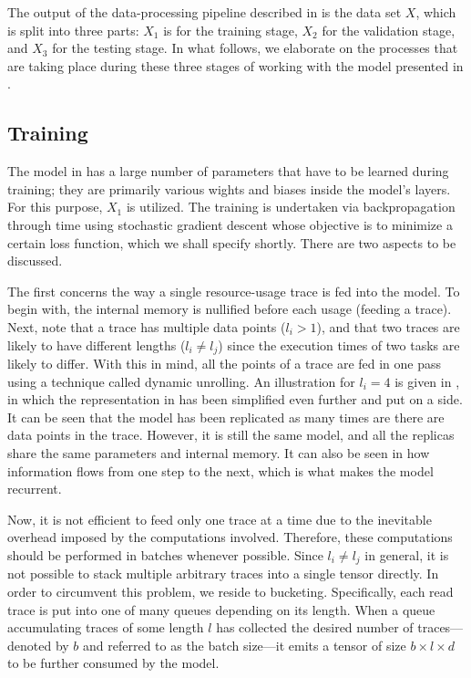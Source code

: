 The output of the data-processing pipeline described in  is the data
set $X$, which is split into three parts: $X_1$ is for the training stage, $X_2$
for the validation stage, and $X_3$ for the testing stage. In what follows, we
elaborate on the processes that are taking place during these three stages of
working with the model presented in .

\subsection{Training} 
The model in  has a large number of parameters that have to be
learned during training; they are primarily various wights and biases inside the
model's layers. For this purpose, $X_1$ is utilized. The training is undertaken
via backpropagation through time using stochastic gradient descent
\cite{goodfellow2016} whose objective is to minimize a certain loss function,
which we shall specify shortly. There are two aspects to be discussed.


The first concerns the way a single resource-usage trace is fed into the model.
To begin with, the internal memory is nullified before each usage (feeding a
trace). Next, note that a trace has multiple data points ($l_i > 1$), and that
two traces are likely to have different lengths ($l_i \neq l_j$) since the
execution times of two tasks are likely to differ. With this in mind, all the
points of a trace are fed in one pass using a technique called dynamic
unrolling. An illustration for $l_i = 4$ is given in , in which the
representation in  has been simplified even further and put on a
side. It can be seen that the model has been replicated as many times are there
are data points in the trace. However, it is still the same model, and all the
replicas share the same parameters and internal memory. It can also be seen in
 how information flows from one step to the next, which is what
makes the model recurrent.

Now, it is not efficient to feed only one trace at a time due to the inevitable
overhead imposed by the computations involved. Therefore, these computations
should be performed in batches whenever possible. Since $l_i \neq l_j$ in
general, it is not possible to stack multiple arbitrary traces into a single
tensor directly. In order to circumvent this problem, we reside to bucketing.
Specifically, each read trace is put into one of many queues depending on its
length. When a queue accumulating traces of some length $l$ has collected the
desired number of traces---denoted by $b$ and referred to as the batch size---it
emits a tensor of size $b \times l \times d$ to be further consumed by the
model.

